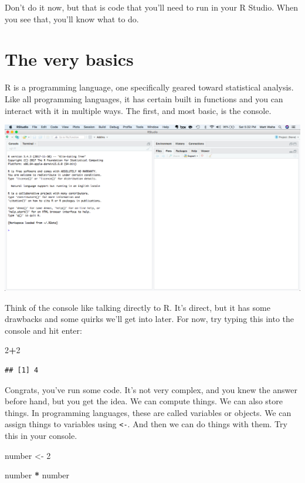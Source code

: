 \documentclass[]{book}
\newenvironment{Shaded}{\begin{snugshade}}{\end{snugshade}}
\newcommand{\DecValTok}[1]{\textcolor[rgb]{0.00,0.00,0.81}{#1}}
\newcommand{\StringTok}[1]{\textcolor[rgb]{0.31,0.60,0.02}{#1}}
\newcommand{\OperatorTok}[1]{\textcolor[rgb]{0.81,0.36,0.00}{\textbf{#1}}}
\newcommand{\NormalTok}[1]{#1}
\begin{document}
Don't do it now, but that is code that you'll need to run in your R
Studio. When you see that, you'll know what to do.

\chapter{The very basics}\label{the-very-basics}

R is a programming language, one specifically geared toward statistical
analysis. Like all programming languages, it has certain built in
functions and you can interact with it in multiple ways. The first, and
most basic, is the console.

\includegraphics[width=18.97in]{images/verybasics1}

Think of the console like talking directly to R. It's direct, but it has
some drawbacks and some quirks we'll get into later. For now, try typing
this into the console and hit enter:

\begin{Shaded}
\begin{Highlighting}[]
\DecValTok{2}\OperatorTok{+}\DecValTok{2}
\end{Highlighting}
\end{Shaded}

\begin{verbatim}
## [1] 4
\end{verbatim}

Congrats, you've run some code. It's not very complex, and you knew the
answer before hand, but you get the idea. We can compute things. We can
also store things. In programming languages, these are called variables
or objects. We can assign things to variables using
\texttt{\textless{}-}. And then we can do things with them. Try this in
your console.

\begin{Shaded}
\begin{Highlighting}[]
\NormalTok{number <-}\StringTok{ }\DecValTok{2}

\NormalTok{number }\OperatorTok{*}\StringTok{ }\NormalTok{number}
\end{Highlighting}
\end{Shaded}
\end{document}
